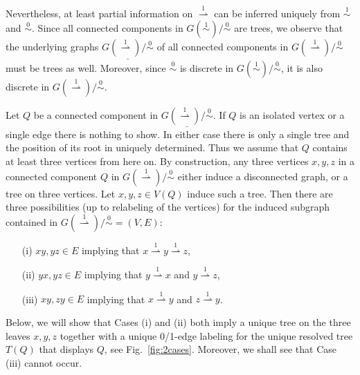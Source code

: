 \documentclass[smallextended]{svjour3}
\newcommand{\TODO}[1]{\begingroup\color{red}#1\endgroup}
\newcommand{\Ro}{\mathrel{\overset{0}{\sim}}}
\newcommand{\Rl}{\mathrel{\overset{1}{\sim}}}
\newcommand{\Rld}{\mathrel{\overset{1}{\rightharpoonup}}}
\begin{document}
Nevertheless, at least partial information on $\Rld$ can be inferred
uniquely from $\Rl$ and $\Ro$. Since all connected components in
$G(\Rl)/\Ro$ are trees, we observe that the underlying graphs
$\underline{G(\Rld)/\Ro}$ of all connected components in $G(\Rld)/\Ro$ must
be trees as well.  Moreover, since $\Ro$ is discrete in $G(\Rl)/\Ro$, it is
also discrete in $G(\Rld)/\Ro$.

Let $Q$ be a connected component in $\underline{G(\Rld)/\Ro}$.  \TODO{If
  $Q$ is an isolated vertex or a single edge there is nothing to show.} In
either case there is only a single tree and the position of its root in
uniquely determined. Thus we assume that $Q$ contains at least three
vertices from here on. By construction, any three vertices $x,y,z$ in a
connected component $Q$ in $G(\Rld)/\Ro$ either induce a disconnected
graph, or a tree on three vertices.  Let $x,y,z\in V(Q)$ induce such a
tree. Then there are three possibilities (up to relabeling of the vertices)
for the induced subgraph contained in $G(\Rld)/\Ro = (V,E)$:
\begin{itemize}
\item[(i)] $xy, yz \in E$ implying that $x\Rld y \Rld z$, 
\item[(ii)] $yx, yz \in E$ implying that $y\Rld x$ and $y \Rld z$,
\item[(iii)] $xy, zy \in E$ implying that $x\Rld y$ and $z \Rld y$. 
\end{itemize}
Below, we will show that Cases (i) and (ii) both imply a unique tree on the
three leaves $x,y,z$ together with a unique 0/1-edge labeling for the
unique resolved tree $T(Q)$ that displays $Q$, see Fig.\
\ref{fig:2cases}. Moreover, we shall see that Case (iii) cannot occur.
\end{document}
